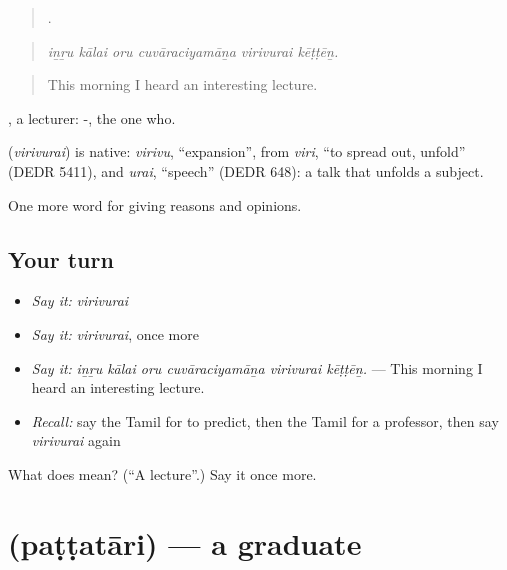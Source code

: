 \begin{quote}
     .
\end{quote}

\begin{quote}
\emph{iṉṟu kālai oru cuvāraciyamāṉa virivurai kēṭṭēṉ.}
\end{quote}

\begin{quote}
This morning I heard an interesting lecture.
\end{quote}

, a lecturer: -, the one who.

\begin{cousinweb}
\textbf{} (\emph{virivurai}) is native: \emph{virivu}, \textquotedblleft{}expansion\textquotedblright{}, from \emph{viri}, \textquotedblleft{}to spread out, unfold\textquotedblright{} (DEDR 5411), and \emph{urai}, \textquotedblleft{}speech\textquotedblright{} (DEDR 648): a talk that unfolds a subject.
\end{cousinweb}

\begin{grammarlens}[title={What you've built}]
One more word for giving reasons and opinions.
\end{grammarlens}

\subsection*{Your turn}
\begin{itemize}
\raggedright
  \item \emph{Say it:} \emph{virivurai}
  \item \emph{Say it:} \emph{virivurai}, once more
  \item \emph{Say it:} \emph{iṉṟu kālai oru cuvāraciyamāṉa virivurai kēṭṭēṉ.} — This morning I heard an interesting lecture.
  \item \emph{Recall:} say the Tamil for to predict, then the Tamil for a professor, then say \emph{virivurai} again
\end{itemize}

\begin{tcolorbox}[breakable,colback=teal!4,colframe=teal!35!black,title={Before you move on}]
What does  mean? (\textquotedblleft{}A lecture\textquotedblright{}.) Say it once more.
\end{tcolorbox}
\section[\texorpdfstring{\ta{பட்டதாரி} (paṭṭatāri)}{பட்டதாரி (paṭṭatāri)}]{ (paṭṭatāri) — a graduate}

